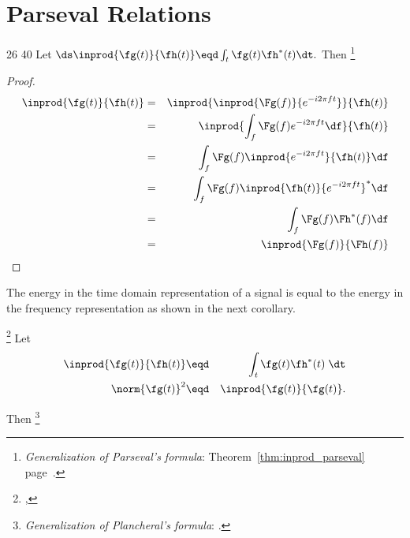 \section{Parseval Relations}
\label{sec:parseval}
\begin{theorem}
\citep{mallat}{26}
\citep{goswami}{40}
\label{thm:GPT}
Let $\ds \inprod{\fg(t)}{\fh(t)} \eqd \int_t \fg(t) \fh^\ast(t) \dt.$
Then 
\footnote{
  {\em Generalization of Parseval's formula}: 
  Theorem~\ref{thm:inprod_parseval} page~\pageref{thm:inprod_parseval}.
  }
\end{theorem}

\begin{proof}
\begin{eqnarray*}
   \inprod{\fg(t)}{\fh(t)}
     &=&    \inprod{\inprod{\Fg(f)}{e^{-i2\pi ft}}}{\fh(t)}
   \\&=&    \inprod{\int_f\Fg(f)e^{-i2\pi ft}\df}{\fh(t)}
   \\&=&    \int_f\Fg(f) \inprod{e^{-i2\pi ft}}{\fh(t)} \df
   \\&=&    \int_f\Fg(f) \inprod{\fh(t)}{e^{-i2\pi ft}}^\ast \df
   \\&=&    \int_f\Fg(f) \Fh^\ast(f) \df
   \\&=&    \inprod{\Fg(f)}{\Fh(f)}
\end{eqnarray*}
\end{proof}

The energy in the time domain representation of a signal 
is equal to the energy in 
the frequency representation as shown in the next corollary.
\begin{corollary}
\footnote{
  ,
  }
\label{cor:plancheral}
Let
\begin{eqnarray*}
   \inprod{\fg(t)}{\fh(t)} &\eqd& \int_t \fg(t) \fh^\ast(t) \; \dt \\
   \norm{\fg(t)}^2 &\eqd& \inprod{\fg(t)}{\fg(t)}.
\end{eqnarray*}

Then
\footnote{
  {\em Generalization of Plancheral's formula}: 
  .
  }
\end{corollary}

